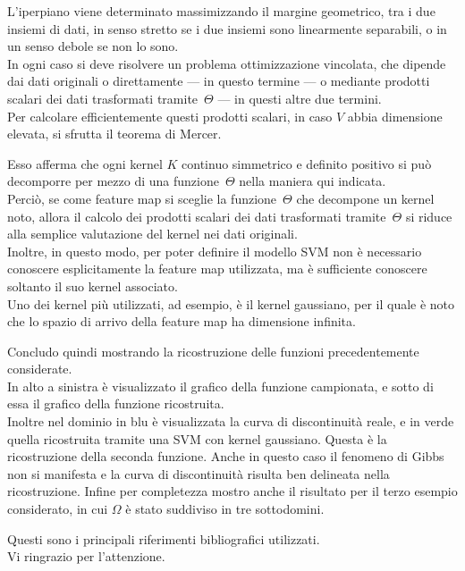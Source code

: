 \rf L’iperpiano viene determinato massimizzando il margine geometrico, tra i due insiemi di dati, in senso stretto se i due insiemi sono linearmente separabili, o in un senso debole se non lo sono.\\
In ogni caso si deve risolvere un problema ottimizzazione vincolata, che dipende dai dati originali o direttamente --- in questo termine --- o  mediante prodotti scalari dei dati trasformati tramite~$\Theta$ --- in questi altre due termini.\\   
Per calcolare efficientemente questi prodotti scalari, in caso $V$ abbia dimensione elevata, si sfrutta il teorema di Mercer.


\rf Esso afferma che ogni kernel $K$ continuo simmetrico e definito positivo si può decomporre  per mezzo di una funzione~$\Theta$ nella maniera qui indicata.\\
Perciò, se come feature map si sceglie la funzione~$\Theta$ che decompone un kernel noto, allora il calcolo dei prodotti scalari dei dati trasformati tramite~$\Theta$ si riduce alla semplice valutazione del kernel nei dati originali.\\
Inoltre, in questo modo, per poter definire il modello SVM non è necessario conoscere esplicitamente la feature map utilizzata, ma è sufficiente conoscere soltanto il suo kernel associato.\\
Uno dei kernel più utilizzati, ad esempio, è il kernel gaussiano, per il quale è noto che lo spazio di arrivo della feature map ha dimensione infinita.


\rf Concludo quindi mostrando la ricostruzione delle funzioni precedentemente considerate.\\
In alto a sinistra è visualizzato il grafico della funzione campionata, e sotto di essa il grafico della funzione ricostruita.\\
Inoltre nel dominio in blu è visualizzata la curva di discontinuità reale, e in verde quella ricostruita tramite una SVM con kernel gaussiano.\nl
\rf Questa è la ricostruzione della seconda funzione.  Anche in questo caso il fenomeno di Gibbs non si manifesta e la curva di discontinuità risulta ben delineata nella ricostruzione.\nl
\rf Infine per completezza mostro anche il risultato per il terzo esempio considerato, in cui $\Omega$ è stato suddiviso in tre sottodomini.

\rf Questi sono i principali riferimenti bibliografici utilizzati.\\
Vi ringrazio per l’attenzione.\nl



\eject
\bye

